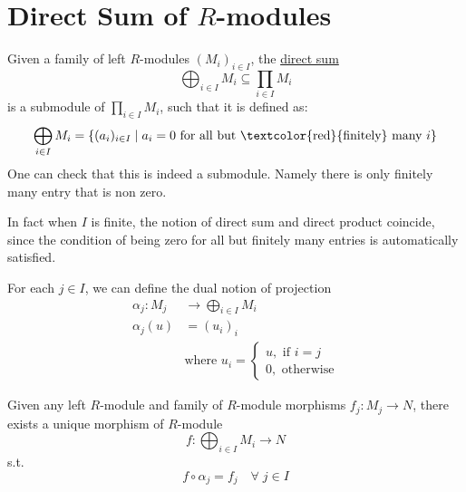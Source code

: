 \section{Direct Sum of \( R \)-modules}

\begin{definition}
	Given a family of left \( R \)-modules \( (M_i)_{i\in I} \), the \underline{direct sum}
	\[
		\bigoplus_{i\in I} M_i \subseteq \prod_{i\in I} M_i
	\]
	is a submodule of \( \prod_{i\in I}M_i \), such that it is defined as:
	\[
		\bigoplus_{i\in I}M_i = \{(a_i)_{i\in I} \; | \; a_i = 0 \text{ for all but
			\textcolor{red}{finitely} many }i\}
	\]
	One can check that this is indeed a submodule. Namely there is only finitely many entry that is
	non zero.
\end{definition}

\begin{remark}
	In fact when \( I \) is finite, the notion of direct sum and direct product coincide, since the
	condition of being zero for all but finitely many entries is automatically satisfied.
\end{remark}

\begin{remark}
	For each \( j \in I \), we can define the dual notion of projection
	\[
		\begin{aligned}
			\alpha_j : M_j & \to \bigoplus_{i\in I} M_i               \\
			\alpha_j (u)   & = (u_i)_i                                \\
			               & \text{where } u_i = \begin{cases}
				                                     u, \text{ if } i = j \\
				                                     0, \text{ otherwise}
			                                     \end{cases}
		\end{aligned}
	\]
\end{remark}

\begin{proposition}
	Given any left \( R \)-module and family of \( R \)-module morphisms \( f_j : M_j \to N \), there
	exists a unique morphism of \( R \)-module
	\[
		f: \bigoplus_{i\in I}M_i \to N
	\]
	s.t.
	\begin{equation}
		\label{eq:univ-prop-direct-sum-module}
		f\circ \alpha_j = f_j \quad \forall \; j \in I
	\end{equation}
\end{proposition}

